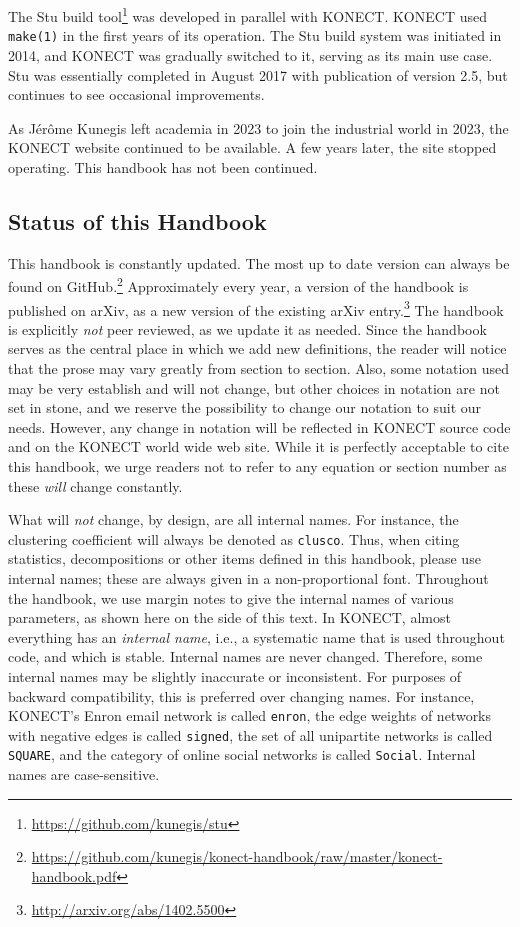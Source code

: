 \documentclass{article}
\begin{document}
The Stu build
tool\footnote{\href{https://github.com/kunegis/stu}{https://github.com/kunegis/stu}}
was developed in parallel with KONECT.  KONECT used \texttt{make(1)} in
the first years of its operation.  The Stu build system was initiated in
2014, and KONECT was gradually switched to it, serving as its main use
case.  Stu was essentially completed in August 2017 with publication of version
2.5, but continues to see occasional improvements.  

As Jérôme Kunegis left academia in 2023 to join the industrial world in 2023,
the KONECT website continued to be available.  A few years later, the site stopped
operating.  This handbook has not been continued.

\subsection{Status of this Handbook}
This handbook is constantly updated.  The most up to date version can
always be found on
GitHub.\footnote{\href{https://github.com/kunegis/konect-handbook/raw/master/konect-handbook.pdf}{https://github.com/kunegis/konect-handbook/raw/master/konect-handbook.pdf}}  
Approximately every year, a version of the handbook is published on
arXiv, as a new version of the existing arXiv
entry.\footnote{\href{http://arxiv.org/abs/1402.5500}{http://arxiv.org/abs/1402.5500}} 
The handbook is explicitly \emph{not} peer reviewed, as we update it as
needed.  Since the handbook serves as the central place in which we add
new definitions, the reader will notice that the prose may vary greatly
from section to section.  Also, some notation used may be very establish
and will not change, but other choices in notation are not set in stone,
and we reserve the possibility to change our notation to suit our
needs.  However, any change in notation will be reflected in KONECT
source code and on the KONECT world wide web site.  While it is
perfectly acceptable to cite this handbook, we urge readers not to refer
to any equation or section number as these \emph{will} change
constantly.  

What will \emph{not} change, by design, are all internal
names.  For instance, the clustering coefficient will always be denoted
as \texttt{clusco}.  Thus, when citing statistics, decompositions or
other items defined in this handbook, please use internal names; these
are always given in a non-proportional font. 
Throughout the handbook, we use margin notes to give the internal 
names of various parameters, as shown here on the side of this text.  
In KONECT, almost everything has an \emph{internal name}, i.e., a
systematic name that is used throughout code, and which is stable.
Internal names are never changed.  Therefore, some internal names may be
slightly inaccurate or inconsistent.  For purposes of backward
compatibility, this is preferred over changing names.  For instance,
KONECT's Enron email network is called \texttt{enron}, the edge weights
of networks with negative edges is called \texttt{signed}, the set
of all unipartite networks is called \texttt{SQUARE}, and the category
of online social networks is called \texttt{Social}.  Internal names are
case-sensitive. 
\end{document}
